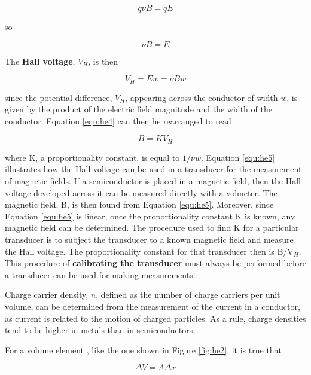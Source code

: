 \begin{equation}
q\nu B=qE
\label{equ:he2}
\end{equation}

\noindent so

\begin{equation}
\nu B=E
\label{equ:he3}
\end{equation}

\noindent The {\bf Hall voltage}, $V_H$, is then

\begin{equation}
V_H=Ew=\nu Bw
\label{equ:he4}
\end{equation}

\noindent since the potential difference, $V_H$, appearing across the conductor of width $w$, is given by the product of the electric field magnitude and the width of the conductor. Equation \ref{equ:he4} can then be rearranged to read

\begin{equation}
B=KV_H
\label{equ:he5}
\end{equation}

\noindent where K, a proportionality constant, is equal to $1/\nu w$. Equation \ref{equ:he5} illustrates how the Hall voltage can be used in a transducer for the measurement of magnetic fields. If a semiconductor is placed in a magnetic field, then the Hall voltage developed across it can be measured directly with a volmeter. The magnetic field, B, is then found from Equation \ref{equ:he5}. Moreover, since Equation \ref{equ:he5} is linear, once the proportionality constant K is known,  any magnetic field can be determined. The procedure used to find K for a particular transducer is to subject the transducer to a known magnetic field and measure the Hall voltage. The proportionality constant for that transducer then is B/V$_H$. This procedure of {\bf calibrating the transducer} must always be performed before a transducer can be used for making measurements.

Charge carrier density, $n$, defined as the number of charge carriers per unit volume, can be determined from the measurement of the current in a conductor, as current is related to the motion of charged particles. As a rule, charge densities tend to be higher in metals than in semiconductors.

For a volume element , like the one shown in Figure \ref{fig:he2}, it is true that

\begin{equation}
\Delta V=A\Delta x
\label{equ:he6}
\end{equation}

